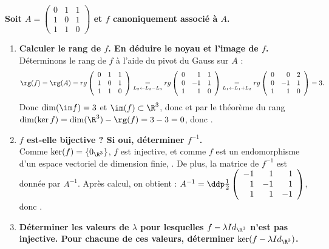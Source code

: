 \documentclass[a4paper, 11pt,reqno]{article}
\begin{document}
\begin{correction}  \;
	\textbf{Soit $A=\left(\begin{array}{lll}  0&1&1\\ 1&0&1\\ 1&1&0 \end{array}\right)$ et $f$ canoniquement associ\'e \`a $A$.}
	\begin{enumerate}
		\item \textbf{Calculer le rang de $f$. En d\'eduire le noyau et l'image de $f$.}\\
		      D\'eterminons le rang de $f$ \`a l'aide du pivot du Gauss sur $A$ :
		      $$ \rg(f) = \rg(A) = rg\left(\begin{array}{rrr}
					      0 & 1 & 1 \\
					      1 & 0 & 1 \\
					      1 & 1 & 0
				      \end{array}\right)
			      \underset{  L_2 \leftarrow L_2-L_3}{=}
			      rg\left(\begin{array}{rrr}
					      0 & 1  & 1 \\
					      0 & -1 & 1 \\
					      1 & 1  & 0
				      \end{array}\right)
			      \underset{ L_1 \leftarrow L_1 + L_2 }{=}
			      rg\left(\begin{array}{rrr}
					      0 & 0  & 2 \\
					      0 & -1 & 1 \\
					      1 & 1  & 0
				      \end{array}\right) = 3 .$$
		      Donc $\dim(\im f)=3$ et $\im(f) \subset \R^3$, donc  et par le th\'eor\`eme du rang $\dim(\ker f) = \dim(\R^3)-\rg(f)=3-3=0$, donc .
		\item \textbf{$f$ est-elle bijective ? Si oui, d\'eterminer $f^{-1}$.}\\
		      Comme $\ker(f)=\{0_{\R^3}\}$, $f$ est injective, et comme $f$ est un endomorphisme d'un espace vectoriel de dimension finie, . De plus, la matrice de $f^{-1}$ est donn\'ee par $A^{-1}$. Apr\`es calcul, on obtient : $A^{-1} = \ddp \frac{1}{2} \left(\begin{array}{rrr}  -1&1&1\\ 1&-1&1\\ 1&1&-1 \end{array}\right)$, donc .
		\item \textbf{D\'eterminer les valeurs de $\lambda$ pour lesquelles $f-\lambda Id_{\R^3}$ n'est pas injective. Pour chacune de ces valeurs, d\'eterminer $\ker (f-\lambda Id_{\R^3})$.}\\

\end{enumerate}
\end{correction}
\end{document}
